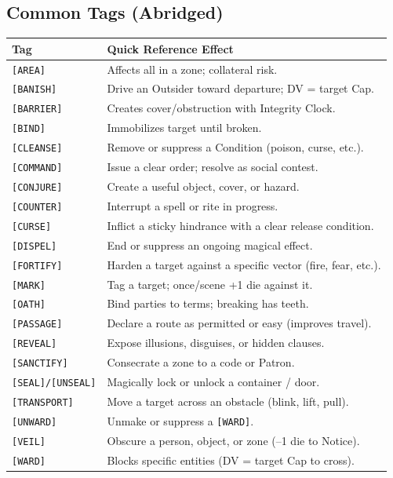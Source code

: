 \subsection{Common Tags (Abridged)}
\begin{center}
\begin{longtable}{|p{3.5cm}|p{10.0cm}|}
\hline
\textbf{Tag} & \textbf{Quick Reference Effect} \\ \hline
\texttt{[AREA]} & Affects all in a zone; collateral risk. \\ \hline
\texttt{[BANISH]} & Drive an Outsider toward departure; DV = target Cap. \\ \hline
\texttt{[BARRIER]} & Creates cover/obstruction with Integrity Clock. \\ \hline
\texttt{[BIND]} & Immobilizes target until broken. \\ \hline
\texttt{[CLEANSE]} & Remove or suppress a Condition (poison, curse, etc.). \\ \hline
\texttt{[COMMAND]} & Issue a clear order; resolve as social contest. \\ \hline
\texttt{[CONJURE]} & Create a useful object, cover, or hazard. \\ \hline
\texttt{[COUNTER]} & Interrupt a spell or rite in progress. \\ \hline
\texttt{[CURSE]} & Inflict a sticky hindrance with a clear release condition. \\ \hline
\texttt{[DISPEL]} & End or suppress an ongoing magical effect. \\ \hline
\texttt{[FORTIFY]} & Harden a target against a specific vector (fire, fear, etc.). \\ \hline
\texttt{[MARK]} & Tag a target; once/scene +1 die against it. \\ \hline
\texttt{[OATH]} & Bind parties to terms; breaking has teeth. \\ \hline
\texttt{[PASSAGE]} & Declare a route as permitted or easy (improves travel). \\ \hline
\texttt{[REVEAL]} & Expose illusions, disguises, or hidden clauses. \\ \hline
\texttt{[SANCTIFY]} & Consecrate a zone to a code or Patron. \\ \hline
\texttt{[SEAL]/[UNSEAL]} & Magically lock or unlock a container / door. \\ \hline
\texttt{[TRANSPORT]} & Move a target across an obstacle (blink, lift, pull). \\ \hline
\texttt{[UNWARD]} & Unmake or suppress a \texttt{[WARD]}. \\ \hline
\texttt{[VEIL]} & Obscure a person, object, or zone (--1 die to Notice). \\ \hline
\texttt{[WARD]} & Blocks specific entities (DV = target Cap to cross). \\ \hline
\end{longtable}
\end{center}

